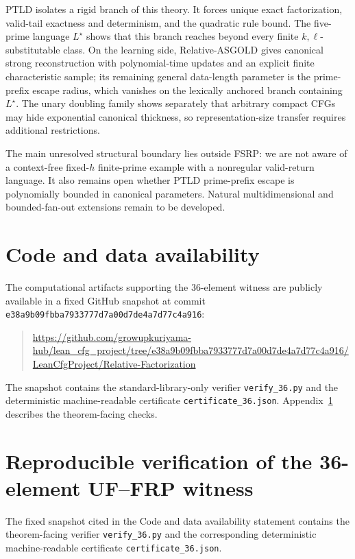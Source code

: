 \documentclass[11pt,a4paper]{article}
\begin{document}
PTLD isolates a rigid branch of this theory.  It forces unique exact factorization, valid-tail exactness and determinism, and the quadratic rule bound.  The five-prime language $L^\star$ shows that this branch reaches beyond every finite $k,\ell$-substitutable class.  On the learning side, Relative-ASGOLD gives canonical strong reconstruction with polynomial-time updates and an explicit finite characteristic sample; its remaining general data-length parameter is the prime-prefix escape radius, which vanishes on the lexically anchored branch containing $L^\star$.  The unary doubling family shows separately that arbitrary compact CFGs may hide exponential canonical thickness, so representation-size transfer requires additional restrictions.

The main unresolved structural boundary lies outside FSRP: we are not aware of a context-free fixed-$h$ finite-prime example with a nonregular valid-return language.  It also remains open whether PTLD prime-prefix escape is polynomially bounded in canonical parameters.  Natural multidimensional and bounded-fan-out extensions remain to be developed.

\section*{Code and data availability}
The computational artifacts supporting the $36$-element witness are publicly available in a fixed GitHub snapshot at commit
\texttt{e38a9b09fbba7933777d7a00d7de4a7d77c4a916}:
\begin{quote}\small
\url{https://github.com/growupkuriyama-hub/lean_cfg_project/tree/e38a9b09fbba7933777d7a00d7de4a7d77c4a916/LeanCfgProject/Relative-Factorization}
\end{quote}
The snapshot contains the standard-library-only verifier \texttt{verify\_36.py} and the deterministic machine-readable certificate \texttt{certificate\_36.json}.  Appendix~\ref{app:36-computation} describes the theorem-facing checks.

\appendix
\section{Reproducible verification of the 36-element UF--FRP witness}
\label{app:36-computation}

The fixed snapshot cited in the Code and data availability statement contains the theorem-facing verifier \texttt{verify\_36.py} and the corresponding deterministic machine-readable certificate \texttt{certificate\_36.json}.
\end{document}
